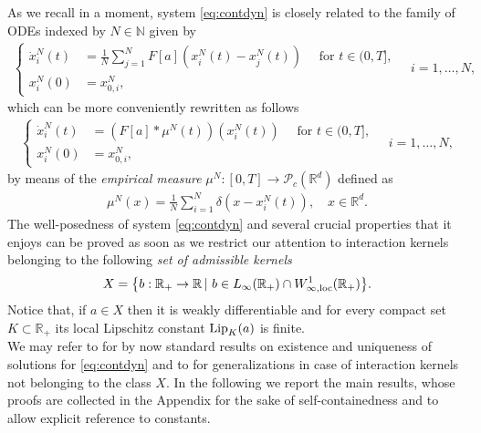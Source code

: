 \documentclass[A4paper,11pt]{article}
\theoremstyle{definition}
\newcommand{\Lip}{\textup{Lip}}
\newcommand{\loc}{\textup{loc}}
\newcommand{\N}{\mathbb{N}}
\newcommand{\R}{\mathbb{R}}
\newcommand{\PC}{\mathcal{P}_c}
\begin{document}
As we recall in a moment, system \eqref{eq:contdyn} is closely related to the family of ODEs indexed by $N \in \N$ given by
\begin{align}\label{eq:discrdyn}
\left\{\begin{aligned}
\dot{x}^N_i(t) &= \frac{1}{N}\sum^N_{j = 1}F[a](x^N_i(t) - x^N_j(t)) \quad \text{ for } t \in (0,T],\\
x_i^N(0) &= x^N_{0,i},
\end{aligned} \quad i = 1, \ldots, N, \right.
\end{align}
which can be more conveniently rewritten as follows
\begin{align}\label{eq:discr1}
\left\{\begin{aligned}
\dot{x}^N_i(t) &= (F[a]*\mu^N(t))(x^N_i(t)) \quad \text{ for } t \in (0,T],\\
x^N_i(0) &= x^N_{0,i},
\end{aligned} \quad i = 1, \ldots, N, \right.
\end{align}
by means of the \textit{empirical measure} $\mu^N:[0,T]\rightarrow\PC(\R^d)$ defined as
\begin{align}\label{eq:empmeas}
\mu^N(x) = \frac{1}{N}\sum^N_{i = 1} \delta(x - x^N_i(t)), \quad x \in \R^d.
\end{align}
The well-posedness of system \eqref{eq:contdyn} and several crucial properties that it enjoys can be proved as soon as we restrict our attention to interaction kernels belonging to the following \textit{set of admissible kernels}
\begin{align*}
	X=\bigl\{b:\R_+\rightarrow\R\,|\ b \in L_{\infty}(\R_+) \cap W^{1}_{\infty,\loc}(\R_+) \bigr \}.
\end{align*}
Notice that, if $a \in X$ then it is weakly differentiable and for every compact set $K \subset \R_+$ its local Lipschitz constant $\Lip_{K}(a)$ is finite.
\\
We may refer to \cite{AGS} for by now standard results on existence and uniqueness of solutions for \eqref{eq:contdyn} and to  \cite{13-Carrillo-Choi-Hauray-MFL} for generalizations in case of interaction kernels not belonging to the class $X$. In the following we report the main results, whose proofs are collected in the Appendix for the sake of self-containedness and to allow explicit reference to constants.
 

\end{document}
